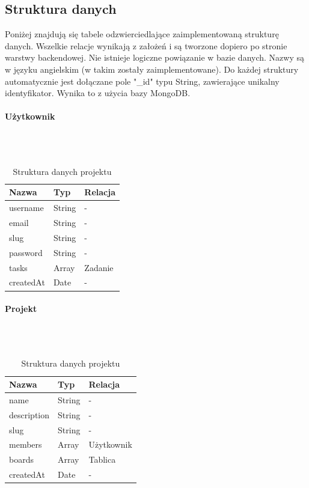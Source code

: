 \documentclass[eng,printmode]{mgr}
\begin{document}
\subsection{Struktura danych}
Poniżej znajdują się tabele odzwierciedlające zaimplementowaną strukturę danych. Wszelkie relacje wynikają z założeń i są tworzone dopiero po stronie warstwy backendowej. Nie istnieje logiczne powiązanie w bazie danych. Nazwy są w języku angielskim (w takim zostały zaimplementowane). Do każdej struktury automatycznie jest dołączane pole "\_id" typu String, zawierające unikalny identyfikator. Wynika to z użycia bazy MongoDB.


\begin{table}[H]
\centering
\begin{minipage}{.4\textwidth}
\paragraph{Użytkownik} \ \\ \\
\begin{tabular}{|l|l|l|}
  \hline 
  \textbf{Nazwa} & \textbf{Typ} & \textbf{Relacja}\\
  \hline
  username & String & -\\
  \hline
  email & String & -\\
  \hline
  slug & String & -\\
  \hline
  password & String & -\\
  \hline
  tasks & Array & Zadanie\\
  \hline
  createdAt & Date & -\\
  \hline
\end{tabular} 
\caption{Struktura danych użytkownika}
\end{minipage}\hfill
\begin{minipage}{.4\textwidth}
\paragraph{Projekt} \ \\ \\
\begin{tabular}{|l|l|l|}
  \hline 
  \textbf{Nazwa} & \textbf{Typ} & \textbf{Relacja}\\
  \hline
  name & String & -\\
  \hline
  description & String & -\\
  \hline
  slug & String & -\\
  \hline
  members & Array & Użytkownik\\
  \hline
  boards & Array & Tablica\\
  \hline
  createdAt & Date & -\\
  \hline
\end{tabular} 
\caption{Struktura danych projektu}
\end{minipage}\hfill
\end{table}
\end{document}
